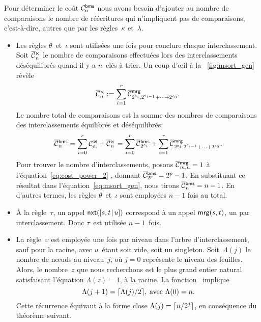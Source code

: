 Pour déterminer le coût
\(\C{\fun{bms}}{n}\) nous avons besoin
d'ajouter au nombre de comparaisons le nombre de réécritures qui
n'impliquent pas de comparaisons, c'est-à-dire, autres que par les
règles~\(\kappa\) et~\(\lambda\).
\begin{itemize}

\item Les règles \(\theta\)~et~\(\iota\) sont utilisées une fois pour
  conclure chaque interclassement. Soit
  \(\OC{\ltimes}{n}\) le nombre de
  comparaisons effectuées lors des interclassements déséquilibrés
  quand il y a \(n\)~clés à trier. Un coup d'{\oe}il à la
  \fig~\vref{fig:msort_gen} révèle
    \begin{equation}
      \OC{\ltimes}{n} :=
      \sum_{i=1}^{r}{\OC{\fun{mrg}}{2^{e_i},2^{e_{i-1}}+\dots+2^{e_0}}}.
      \label{eq:C_unbal}
    \end{equation}
    Le nombre total de comparaisons est la somme des nombres de
    comparaisons des interclassements équilibrés et déséquilibrés:
    \begin{equation}
      \OC{\fun{bms}}{n}
      = \sum_{i=0}^{r}{\C{\Join}{e_i}}
      +
      \OC{\ltimes}{n}
      = \sum_{i=0}^{r}{\OC{\fun{bms}}{2^{e_i}}}
      +
      \sum_{i=1}^{r}{\OC{\fun{mrg}}{2^{e_i},2^{e_{i-1}}+\dots+2^{e_0}}}.
      \label{eq:msort_gen}
    \end{equation}
    Pour trouver le nombre d'interclassements, posons
    \(\OC{\fun{mrg}}{m,n} = 1\) à l'équation~\eqref{eq:cost_power_2}
    , donnant \(\OC{\fun{bms}}{2^p} = 2^p -
    1\). En substituant ce résultat dans
    l'équation~\eqref{eq:msort_gen}, nous tirons \(\OC{\fun{bms}}{n} =
    n - 1\). En d'autres termes, les règles \(\theta\)~et~\(\iota\)
    sont employées \(n-1\)\label{eq:bms_merges} fois au
    total.

  \item À la règle~\(\tau\), un appel
    \(\fun{nxt}(\cons{s,t}{u})\) correspond à
    un appel \(\fun{mrg}(s,t)\), un par
    interclassement. Donc \(\tau\)~est utilisée \(n-1\)~fois.

  \item La règle~\(\upsilon\) est employée une fois par niveau dans
    l'arbre d'interclassement,
    sauf pour la racine, avec \(u\)~étant soit vide, soit un
    singleton. Soit~\(\Lambda(j)\) le nombre de n{\oe}uds au
    niveau~\(j\), où \(j=0\) représente le niveau des feuilles. Alors,
    le nombre~\(z\) que nous recherchons est le plus grand entier
    natural satisfaisant l'équation \(\Lambda(z) = 1\), à la racine.
    La fonction~ implique
    \begin{equation*}
      \Lambda(j+1) = \ceiling{\Lambda(j)/2},\; \text{avec \(\Lambda(0)
        = n\)}.
    \end{equation*}
    Cette récurrence équivaut à la forme close \(\Lambda(j) =
    \ceiling{n/2^j}\), en conséquence du théorème suivant.


\end{itemize}
